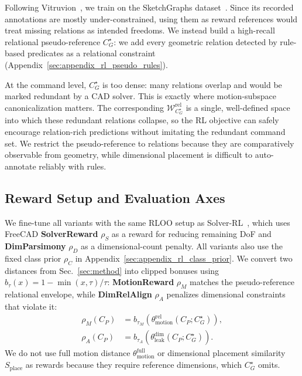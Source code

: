 Following Vitruvion~\cite{seff2021vitruvion}, we train on the SketchGraphs dataset~\cite{seff2020sketchgraphs}. Since its recorded annotations are mostly under-constrained, using them as reward references would treat missing relations as intended freedoms. We instead build a high-recall relational pseudo-reference $C_G^\star$: we add every geometric relation detected by rule-based predicates as a relational constraint (Appendix~\ref{sec:appendix_rl_pseudo_rules}).

At the command level, $C_G^\star$ is too dense: many relations overlap and would be marked redundant by a CAD solver. This is exactly where motion-subspace canonicalization matters. The corresponding $\mathcal{W}_{C_G^\star}^{\mathrm{rel}}$ is a single, well-defined space into which these redundant relations collapse, so the RL objective can safely encourage relation-rich predictions without imitating the redundant command set. We restrict the pseudo-reference to relations because they are comparatively observable from geometry, while dimensional placement is difficult to auto-annotate reliably with rules.

\subsection{Reward Setup and Evaluation Axes}
\label{sec:rl_reward_design}

We fine-tune all variants with the same RLOO setup as Solver-RL~\cite{casey2025aligning}, which uses FreeCAD \textbf{SolverReward} $\rho_S$ as a reward for reducing remaining DoF and \textbf{DimParsimony} $\rho_D$ as a dimensional-count penalty. All variants also use the fixed class prior $\rho_C$ in Appendix~\ref{sec:appendix_rl_class_prior}. We convert two distances from Sec.~\ref{sec:method} into clipped bonuses using $b_\tau(x)=1-\min(x,\tau)/\tau$: \textbf{MotionReward} $\rho_M$ matches the pseudo-reference relational envelope, while \textbf{DimRelAlign} $\rho_A$ penalizes dimensional constraints that violate it:
\begin{align}
    \rho_M(C_P)
    &=
    b_{\tau_M}\!\left(
    \theta_\mathrm{motion}^\mathrm{rel}(C_P;C_G^\star)
    \right),
    \label{eq:motion_reward}\\
    \rho_A(C_P)
    &=
    b_{\tau_A}\!\left(
    \theta_{\mathrm{leak}}^{\mathrm{dim}}(C_P;C_G^\star)
    \right).
    \label{eq:dim_rel_align_reward}
\end{align}
We do not use full motion distance $\theta_\mathrm{motion}^\mathrm{full}$ or dimensional placement similarity $S_\mathrm{place}$ as rewards because they require reference dimensions, which $C_G^\star$ omits.

